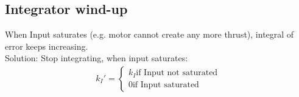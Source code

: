 \subsection*{Integrator wind-up}
    When Input saturates (e.g. motor cannot create any more thrust), integral of error keeps increasing.\\
    Solution: Stop integrating, when input saturates:
    \begin{align*}
        k_I' = \begin{cases}
            k_I \text{if Input not saturated}\\
            0 \text{if Input saturated}
        \end{cases}
    \end{align*}